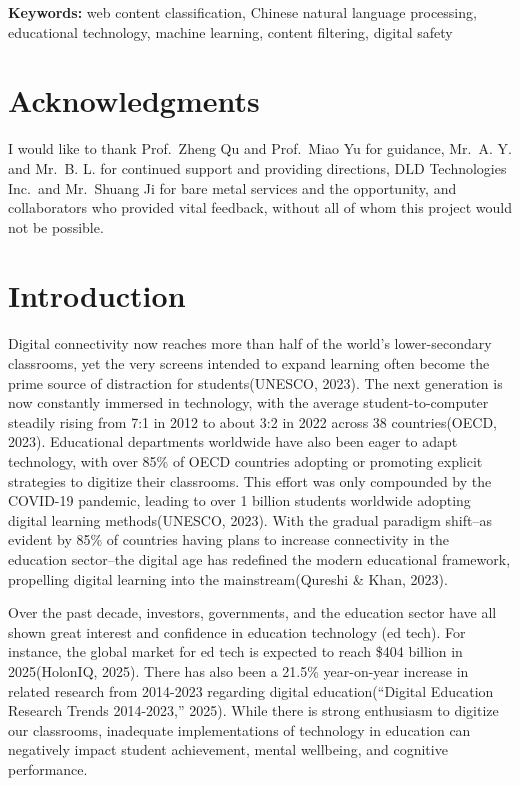 \documentclass[
  titlepage]{article}
\begin{document}
\textbf{Keywords:} web content classification, Chinese natural language
processing, educational technology, machine learning, content filtering,
digital safety

\newpage

\section*{Acknowledgments}\label{acknowledgments}

I would like to thank Prof.~Zheng Qu and Prof.~Miao Yu for guidance,
Mr.~A. Y. and Mr.~B. L. for continued support and providing directions,
DLD Technologies Inc.~and Mr.~Shuang Ji for bare metal services and the
opportunity, and collaborators who provided vital feedback, without all
of whom this project would not be possible.

\section{Introduction}\label{introduction}

Digital connectivity now reaches more than half of the world's
lower-secondary classrooms, yet the very screens intended to expand
learning often become the prime source of distraction for
students(UNESCO, 2023). The next generation is now constantly immersed
in technology, with the average student-to-computer steadily rising from
7:1 in 2012 to about 3:2 in 2022 across 38 countries(OECD, 2023).
Educational departments worldwide have also been eager to adapt
technology, with over 85\% of OECD countries adopting or promoting
explicit strategies to digitize their classrooms. This effort was only
compounded by the COVID-19 pandemic, leading to over 1 billion students
worldwide adopting digital learning methods(UNESCO, 2023). With the
gradual paradigm shift--as evident by 85\% of countries having plans to
increase connectivity in the education sector--the digital age has
redefined the modern educational framework, propelling digital learning
into the mainstream(Qureshi \& Khan, 2023).

Over the past decade, investors, governments, and the education sector
have all shown great interest and confidence in education technology (ed
tech). For instance, the global market for ed tech is expected to reach
\$404 billion in 2025(HolonIQ, 2025). There has also been a 21.5\%
year-on-year increase in related research from 2014-2023 regarding
digital education({``Digital Education Research Trends 2014-2023,''}
2025). While there is strong enthusiasm to digitize our classrooms,
inadequate implementations of technology in education can negatively
impact student achievement, mental wellbeing, and cognitive performance.
\end{document}
